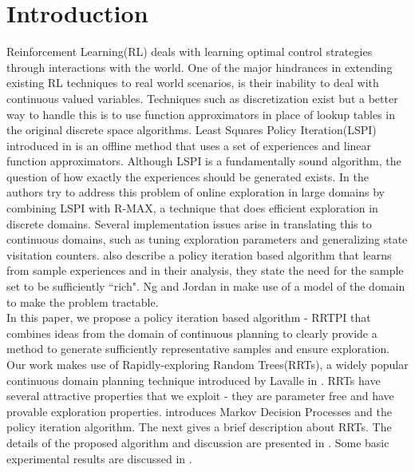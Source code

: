 \documentclass[wcp]{jmlr}
\begin{document}
\section{Introduction}
Reinforcement Learning(RL) deals with learning optimal control strategies through interactions with the world. One of the major hindrances in extending existing RL techniques to real world scenarios, is their inability to deal with continuous valued variables. Techniques such as discretization exist but a better way to handle this is to use function approximators in place of lookup tables in the original discrete space algorithms. Least Squares Policy Iteration(LSPI) introduced in \citep{lspi} is an offline method that uses a set of experiences and linear function approximators. Although LSPI is a fundamentally sound algorithm, the question of how exactly the experiences should be generated exists. In \citep{rmaxlspi} the authors try to address this problem of online exploration in large domains by combining LSPI with R-MAX, a technique that does efficient exploration in discrete domains. Several implementation issues arise in translating this to continuous domains, such as tuning exploration parameters and generalizing state visitation counters. \citep{antosml} also describe a policy iteration based algorithm that learns from sample experiences and in their analysis, they state the need for the sample set to be sufficiently ``rich". Ng and Jordan in \citep{pegasus} make use of a model of the domain to make the problem tractable.\\
 In this paper, we propose a policy iteration based algorithm - RRTPI that combines ideas from the domain of continuous planning to clearly provide a method to generate sufficiently representative samples and ensure exploration. Our work makes use of Rapidly-exploring Random Trees(RRTs), a widely popular continuous domain planning technique introduced by Lavalle in \citep{rrt}. RRTs have several attractive properties that we exploit - they are parameter free and have provable exploration properties. 
 introduces Markov Decision Processes and the policy iteration algorithm. The next  gives a brief description about RRTs. The details of the proposed algorithm and discussion are presented in . Some basic experimental results are discussed in .
\end{document}
